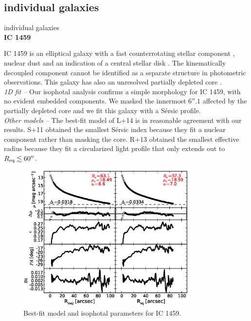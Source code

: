 \documentclass[preprint2]{emulateapj}
\newcommand{\fitfigurewidth}{0.8\textwidth}
\begin{document}




  \onecolumngrid
  \subsection{individual galaxies}
  \label{sec:indgal}

  individual galaxies \\

  \clearpage\newpage\noindent
  {\bf IC 1459 \\}

  IC 1459 is an elliptical galaxy with a fast counterrotating stellar component \citep{franxillingworth1988ic1459,cappellari2002ic1459},
  nuclear dust and an indication of a central stellar disk \citep{forbes1994ic1459}.
  The kinematically decoupled component cannot be identified as a separate structure in photometric observations.
  This galaxy has also an unresolved partially depleted core \citep{rusli2013}. \\ %

  \emph{1D fit -- }
  Our isophotal analysis confirms a simple morphology for IC 1459, with no evident embedded components.
  We masked the innermost $6''.1$ affected by the partially depleted core 
  and we fit this galaxy with a S\'ersic profile. \\

  \emph{Other models -- } 
  The best-fit model of L+14 is in reasonable agreement with our results. 
  S+11 obtained the smallest S\'ersic index because they fit a nuclear component rather than masking the core. 
  R+13 obtained the smallest effective radius 
  because they fit a circularized light profile that only extends out to $R_{\rm eq} \lesssim 60''$. 


  \begin{figure}[h]
  \begin{center}
  \includegraphics[width=\fitfigurewidth]{images/ic1459_1Dfit.eps}
  \caption{Best-fit model and isophotal parameters for IC 1459.}
  \end{center}
  \end{figure}
\end{document}

